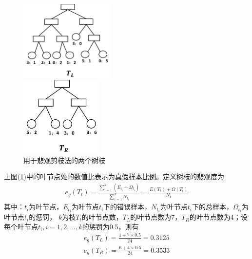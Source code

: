             	\begin{figure}[H]
  				\centering
  				\begin{varwidth}[t]{\textwidth}
    			\vspace{0pt}
    			\includegraphics[height=4cm]{images/Two_branches_for_pessimistic1.png}
  				\end{varwidth}
  				\qquad \qquad
  				\begin{varwidth}[t]{\textwidth}
    			\vspace{0pt}
    			\includegraphics[height=4cm]{images/Two_branches_for_pessimistic2.jpg}
  				\end{varwidth}
				\caption{用于悲观剪枝法的两个树枝}
				\label{fig:用于悲观剪枝法的两个树枝}
				\end{figure}
            上图(\ref{fig:用于悲观剪枝法的两个树枝})中的叶节点处的数值比表示为\underline{真假样本比例}。定义树枝的悲观度为
            \begin{align*}
            e_g(T_t) = \frac{\sum_{i=1}^k(E_{t_i}+\Omega_{t_i})}{\sum_{i=1}^k N_{t_i}} = \frac{E(T_t)+\Omega(T_t)}{N_t}
            \end{align*}
            其中：$t_i$为叶节点，$E_{t_i}$为叶节点$t_i$下的错误样本，$N_{t_i}$为叶节点$t_i$下的总样本，$\Omega_{t_i}$为叶节点$t_i$的惩罚， $k$为枝$T_t$的叶节点数，$T_L$的叶节点数为7，$T_R$的叶节点数为4；设每个叶节点$t_i,i=1,2,\dots,k$的惩罚为0.5，则有
            \begin{align*}
            e_g(T_L) = \frac{4+7\times 0.5}{24}=0.3125\\
            e_g(T_R) = \frac{6+4\times 0.5}{24} = 0.3533
            \end{align*}
